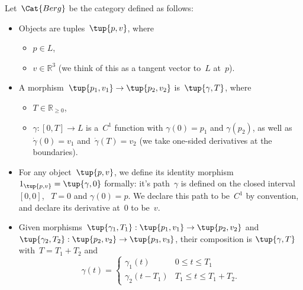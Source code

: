 \begin{definition}
Let~$\Cat{Berg}$ be the category defined as follows:

\begin{itemize}

\item Objects are tuples~$\tup{p, v}$, where
\begin{itemize}
\item $p \in L$,
\item $v \in \mathbb{R}^3$ (we think of this as a tangent vector to~$L$ at~$p$).
\end{itemize}

\item A morphism~$\tup{p_1, v_1} \rightarrow \tup{p_2, v_2}$ is~$\tup{\gamma, T}$,
where
\begin{itemize}
\item $T \in \mathbb{R}_{\geq 0}$,
\item $\gamma \colon [0, T] \to L$ is a~$C^1$ function with $\gamma(0)=p_1$ and $\gamma(p_2)$, as well as ~$\dot \gamma(0) = v_1$ and~$\dot \gamma(T) = v_2$  (we take one-sided derivatives at the boundaries). 
\end{itemize}

\item For any object~$\tup{p, v}$, we define its identity morphism~$1_{\tup{p,v}} = \tup{\gamma, 0}$ formally: it's path~$\gamma$ is defined on the closed interval~$[0,0]$, ~$T= 0$ and $\gamma(0) = p$. We declare this path to be~$C^1$ by convention, and declare its derivative at~$0$ to be~$v$.

\item Given morphisms~$\tup{\gamma_1, T_1}: \tup{p_1, v_1} \to \tup{p_2, v_2}$ and~$\tup{\gamma_2, T_2}: \tup{p_2, v_2} \to \tup{p_3, v_3}$, their composition is $\tup{\gamma, T}$ with~$T = T_1 + T_2$ and
\begin{equation}
 \gamma(t) = \begin{cases}
 \gamma_1(t) &0 \leq t \leq T_1 \\
\gamma_2(t - T_1) & T_1 \leq t \leq T_1 + T_2.
 \end{cases}
\end{equation}
\end{itemize}

\end{definition}


